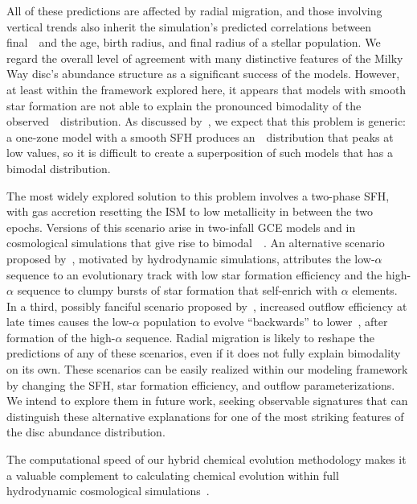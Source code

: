 \documentclass[draft2.tex]{subfiles}
\begin{document}
All of these predictions are affected by radial migration, and those involving 
vertical trends also inherit the simulation's predicted correlations between 
final~\absz~and the age, birth radius, and final radius of a stellar 
population. 
We regard the overall level of agreement with many distinctive features of the 
Milky Way disc's abundance structure as a significant success of the models. 
However, at least within the framework explored here, it appears that models 
with smooth star formation are not able to explain the pronounced bimodality 
of the observed~\afe~distribution. As discussed by~\citet{Vincenzo2021a}, 
we expect that this problem is generic: a one-zone model with a smooth SFH 
produces an~\afe~distribution that peaks at low values, so it is difficult 
to create a superposition of such models that has a bimodal distribution. 
\par 
The most widely explored solution to this problem involves a two-phase SFH, 
with gas accretion resetting the ISM to low metallicity in between the two 
epochs. 
Versions of this scenario arise in two-infall GCE models 
\citep[e.g.][]{Chiappini1997, Spitoni2019a, Khoperskov2021} and in cosmological 
simulations that give rise to bimodal~\afe~\citep{Mackereth2018, Grand2018, 
Buck2020b}. 
An alternative scenario proposed by~\citet{Clarke2019}, motivated by 
hydrodynamic simulations, attributes the low-$\alpha$ sequence to an 
evolutionary track with low star formation efficiency and the high-$\alpha$ 
sequence to clumpy bursts of star formation that self-enrich with $\alpha$ 
elements. 
In a third, possibly fanciful scenario proposed by~\citet{Weinberg2017}, 
increased outflow efficiency at late times causes the low-$\alpha$ population 
to evolve ``backwards'' to lower~\feh, after formation of the high-$\alpha$ 
sequence. 
Radial migration is likely to reshape the predictions of any of these scenarios, 
even if it does not fully explain bimodality on its own. 
These scenarios can be easily realized within our modeling framework by 
changing the SFH, star formation efficiency, and outflow parameterizations. 
We intend to explore them in future work, seeking observable signatures that 
can distinguish these alternative explanations for one of the most striking 
features of the disc abundance distribution. 
\par 
The computational speed of our hybrid chemical evolution methodology makes it a 
valuable complement to calculating chemical evolution within full hydrodynamic 
cosmological simulations~\citep[e.g.][]{Mackereth2018, Grand2018, Naiman2018, 
Buck2020b, Vincenzo2020}. 
\end{document}

